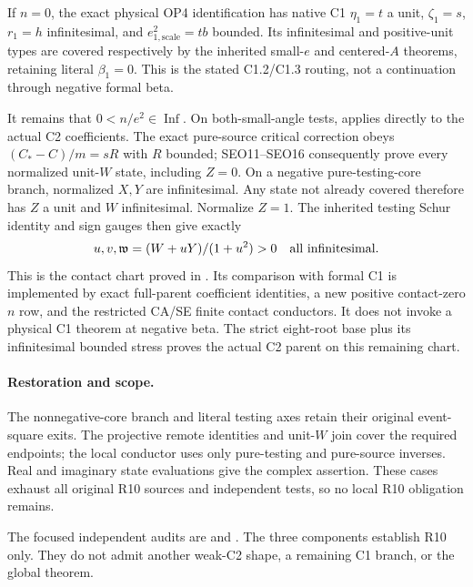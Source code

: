 If $n=0$, the exact physical OP4 identification has native C1
$\eta_1=t$ a unit, $\zeta_1=s$, $r_1=h$ infinitesimal, and
$e_{1,\mathrm{scale}}^2=tb$ bounded. Its infinitesimal and positive-unit
types are covered respectively by the inherited small-$e$ and
centered-$A$ theorems, retaining literal $\beta_1=0$.
This is the stated C1.2/C1.3 routing, not a continuation through
negative formal beta.

It remains that $0<n/e^2\in\operatorname{Inf}$. On both-small-angle
tests,  applies directly to the
actual C2 coefficients. The exact pure-source critical correction
obeys $(C_*-C)/m=sR$ with $R$ bounded; SEO11--SEO16 consequently
prove every normalized unit-$W$ state, including $Z=0$.
On a negative pure-testing-core branch, normalized $X,Y$ are
infinitesimal. Any state not already covered therefore has $Z$ a
unit and $W$ infinitesimal. Normalize $Z=1$. The inherited testing
Schur identity and sign gauges then give exactly
\[
 u,v,\mathfrak w=(W+uY)/(1+u^2)>0
                 \quad\hbox{all infinitesimal}.
\]
This is the contact chart proved in
. Its comparison with formal C1
is implemented by exact full-parent coefficient identities, a new
positive contact-zero $n$ row, and the restricted CA/SE finite
contact conductors. It does not invoke a physical C1 theorem at
negative beta. The strict eight-root base plus its infinitesimal
bounded stress proves the actual C2 parent on this remaining chart.

\paragraph{Restoration and scope.}
The nonnegative-core branch and literal testing axes retain their
original event-square exits. The projective remote identities and
unit-$W$ join cover the required endpoints; the local conductor
uses only pure-testing and pure-source inverses. Real and imaginary
state evaluations give the complex assertion. These cases exhaust
all original R10 sources and independent tests, so no local R10
obligation remains.

The focused independent audits are
 and
.
The three components establish R10 only. They do not admit another
weak-C2 shape, a remaining C1 branch, or the global theorem.

